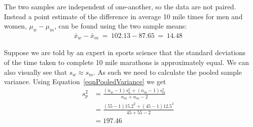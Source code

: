 The two samples are independent of one-another, so the data are not paired. Instead a point estimate of the difference in average 10 mile times for men and women, $\mu_w - \mu_m$, can be found using the two sample means:
\begin{eqnarray*}
\bar{x}_{w} - \bar{x}_{m}\ =\ 102.13 - 87.65\ =\ 14.48
\end{eqnarray*}



Suppose we are told by an expert in sports science that the standard deviations of the time taken
to complete 10 mile marathons is approximately equal.
We can also visually see that $s_{w} \approx s_{m}$.
As such we need to calculate the pooled sample variance. Using Equation~\eqref{eqnPooledVariance} we get
\begin{align*}
s_{p}^{2} 	& = \frac{ (n_{w}-1)s_{w}^{2} + (n_{m}-1)s_{m}^{2} }{n_{m} + n_{m} - 2}	\\
		& = \frac{ (55 -1)15.2^{2} + (45-1)12.5^{2} }{45 + 55 - 2}	\\
		& = 197.46
\end{align*}

